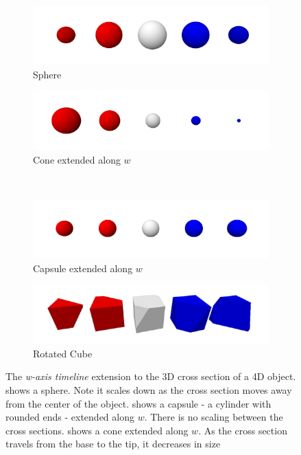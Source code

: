 \documentclass{l4proj}
\begin{document}
\begin{figure}[H]
  \begin{subfigure}[b]{0.47\textwidth}
    \includegraphics[width=\textwidth]{images/representations/timeline-sphere.png}
    \caption{Sphere}
    \label{fig:rep_timeline-sphere}
  \end{subfigure}
  \begin{subfigure}[b]{0.47\textwidth}
    \includegraphics[width=\textwidth]{images/representations/timeline-cone.png}
    \caption{Cone extended along $w$}
    \label{fig:rep_timeline-cone}
  \end{subfigure}
  \\
  \begin{subfigure}[b]{0.47\textwidth}
    \includegraphics[width=\textwidth]{images/representations/timeline-capsule.png}
    \caption{Capsule extended along $w$}
    \label{fig:rep_timeline-capsule}
  \end{subfigure}
  \begin{subfigure}[b]{0.47\textwidth}
    \includegraphics[width=\textwidth]{images/representations/timeline-cube.png}
    \caption{Rotated Cube}
    \label{fig:rep_timeline-cube}
  \end{subfigure}
  \caption{
    The \emph{w-axis timeline} extension to the 3D cross section of a 4D object.
     shows a sphere. Note it scales down as the cross section moves away from the center of the object.
     shows a capsule - a cylinder with rounded ends - extended along $w$. There is no scaling between the cross sections.
     shows a cone extended along $w$. As the cross section travels from the base to the tip, it decreases in size
    }
  \label{fig:rep_timeline}
\end{figure}
\end{document}
